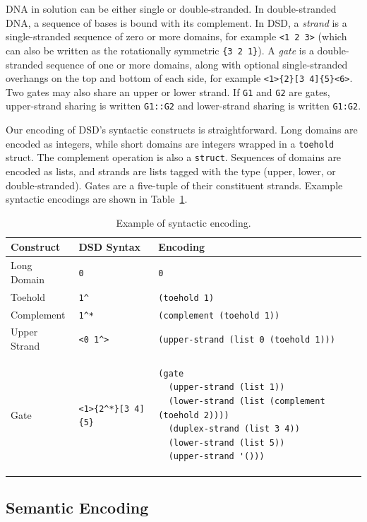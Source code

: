 \documentclass{article}
\begin{document}
DNA in solution can be either single or double-stranded.
In double-stranded DNA, a sequence of bases is bound with its complement.
In DSD, a \emph{strand} is a single-stranded sequence of zero or more domains, for
example \verb;<1 2 3>; (which can also be written as the rotationally symmetric
\verb;{3 2 1};).
A \emph{gate} is a double-stranded sequence of one or more domains,
along with optional single-stranded overhangs on the top and bottom of each
side, for example \verb;<1>{2}[3 4]{5}<6>;.
Two gates may also share an upper or lower strand. If \verb;G1; and \verb;G2;
are gates, upper-strand sharing is written \verb;G1::G2; and lower-strand
sharing is written \verb;G1:G2;.

Our encoding of DSD's syntactic constructs is straightforward.
Long domains are encoded as integers, while
short domains are integers wrapped in a \verb;toehold; struct.
The complement operation is also a \verb;struct;.
Sequences of domains are encoded as lists, and strands are lists
tagged with the type (upper, lower, or double-stranded). Gates
are a five-tuple of their constituent strands.
Example syntactic encodings are shown in Table~\ref{table:encoding-example}.

\begin{table}
\begin{tabular}{|l|l|l|} \hline
Construct     & DSD Syntax    & Encoding                      \\ \hline
Long Domain   & \verb;0;      & \verb;0;                      \\ \hline
Toehold       & \verb;1^;     & \verb;(toehold 1);            \\ \hline
Complement    & \verb;1^*;    & \verb;(complement (toehold 1)); \\ \hline
Upper Strand  & \verb;<0 1^>; & \verb;(upper-strand (list 0 (toehold 1))); \\
\hline
Gate          & \verb;<1>{2^*}[3 4]{5}; &
\begin{lstlisting}
(gate
  (upper-strand (list 1))
  (lower-strand (list (complement (toehold 2))))
  (duplex-strand (list 3 4))
  (lower-strand (list 5))
  (upper-strand '()))
\end{lstlisting}
\\
\hline
\end{tabular}
\caption{Example of syntactic encoding.}
\label{table:encoding-example}
\end{table}

\subsection{Semantic Encoding}
\end{document}
